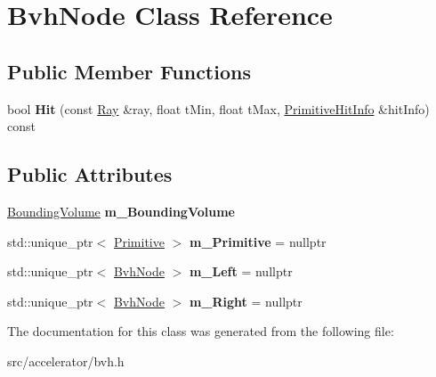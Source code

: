 \hypertarget{class_bvh_node}{}\section{Bvh\+Node Class Reference}
\label{class_bvh_node}
\subsection*{Public Member Functions}
\begin{DoxyCompactItemize}
\item 
\mbox{\label{class_bvh_node_a0be91539815ae1cfb78366bd9fa88a62}} 
bool {\bfseries Hit} (const \mbox{\hyperlink{class_ray}{Ray}} \&ray, float t\+Min, float t\+Max, \mbox{\hyperlink{struct_primitive_hit_info}{Primitive\+Hit\+Info}} \&hit\+Info) const
\end{DoxyCompactItemize}
\subsection*{Public Attributes}
\begin{DoxyCompactItemize}
\item 
\mbox{\label{class_bvh_node_a21bd95677768c8052c70c2fd62c8b6c4}} 
\mbox{\hyperlink{class_bounding_volume}{Bounding\+Volume}} {\bfseries m\+\_\+\+Bounding\+Volume}
\item 
\mbox{\label{class_bvh_node_a243cdf77d3354ff7a377c3e0315375be}} 
std\+::unique\+\_\+ptr$<$ \mbox{\hyperlink{class_primitive}{Primitive}} $>$ {\bfseries m\+\_\+\+Primitive} = nullptr
\item 
\mbox{\label{class_bvh_node_a8cb96fbcef603d08da93de03ac7b9bf7}} 
std\+::unique\+\_\+ptr$<$ \mbox{\hyperlink{class_bvh_node}{Bvh\+Node}} $>$ {\bfseries m\+\_\+\+Left} = nullptr
\item 
\mbox{\label{class_bvh_node_afc0cc1a05f0237c4c6a14c72c2d9ee0b}} 
std\+::unique\+\_\+ptr$<$ \mbox{\hyperlink{class_bvh_node}{Bvh\+Node}} $>$ {\bfseries m\+\_\+\+Right} = nullptr
\end{DoxyCompactItemize}


The documentation for this class was generated from the following file\+:\begin{DoxyCompactItemize}
\item 
src/accelerator/bvh.\+h\end{DoxyCompactItemize}
